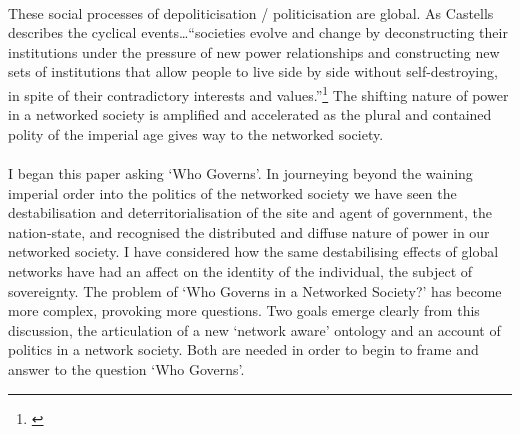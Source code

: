 \paragraph{}These social processes of depoliticisation / politicisation are global. As Castells describes the cyclical events\ldots ``societies evolve and change by deconstructing their institutions under the pressure of new power relationships and constructing new sets of institutions that allow people to live side by side without self-destroying, in spite of their contradictory interests and values.''\footnote{\cite[p. 258]{castells:2007cp}} The shifting nature of power in a networked society is amplified and accelerated as the plural and contained polity of the imperial age gives way to the  networked society.

\paragraph{}I began this paper asking `Who Governs'. In journeying beyond the waining imperial order into the politics of the networked society we have seen the destabilisation and deterritorialisation of the site and agent of government, the nation-state, and recognised the distributed and diffuse nature of power in our networked society. I have considered how the same destabilising effects of global networks have had an affect on the identity of the individual, the subject of sovereignty. The problem of `Who Governs in a Networked Society?' has become more complex, provoking more questions. Two goals emerge clearly from this discussion, the articulation of a new `network aware' ontology and an account of politics in a network society. Both are needed in order to begin to frame and answer to the question `Who Governs'.
